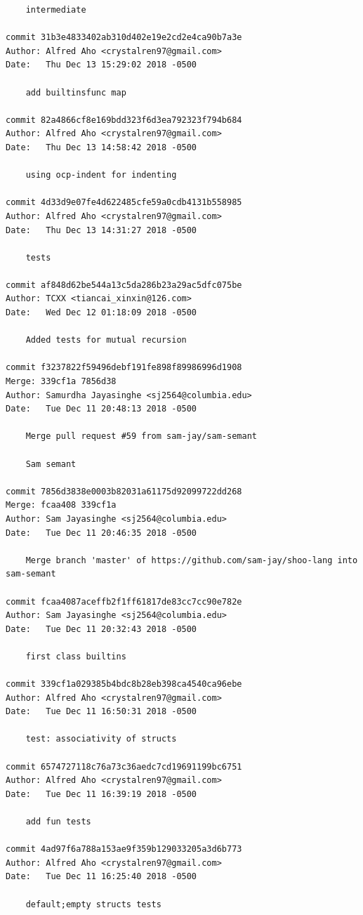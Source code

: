 \documentclass[12pt]{article}
\begin{document}
\begin{lstlisting}
    intermediate

commit 31b3e4833402ab310d402e19e2cd2e4ca90b7a3e
Author: Alfred Aho <crystalren97@gmail.com>
Date:   Thu Dec 13 15:29:02 2018 -0500

    add builtinsfunc map

commit 82a4866cf8e169bdd323f6d3ea792323f794b684
Author: Alfred Aho <crystalren97@gmail.com>
Date:   Thu Dec 13 14:58:42 2018 -0500

    using ocp-indent for indenting

commit 4d33d9e07fe4d622485cfe59a0cdb4131b558985
Author: Alfred Aho <crystalren97@gmail.com>
Date:   Thu Dec 13 14:31:27 2018 -0500

    tests

commit af848d62be544a13c5da286b23a29ac5dfc075be
Author: TCXX <tiancai_xinxin@126.com>
Date:   Wed Dec 12 01:18:09 2018 -0500

    Added tests for mutual recursion

commit f3237822f59496debf191fe898f89986996d1908
Merge: 339cf1a 7856d38
Author: Samurdha Jayasinghe <sj2564@columbia.edu>
Date:   Tue Dec 11 20:48:13 2018 -0500

    Merge pull request #59 from sam-jay/sam-semant
    
    Sam semant

commit 7856d3838e0003b82031a61175d92099722dd268
Merge: fcaa408 339cf1a
Author: Sam Jayasinghe <sj2564@columbia.edu>
Date:   Tue Dec 11 20:46:35 2018 -0500

    Merge branch 'master' of https://github.com/sam-jay/shoo-lang into sam-semant

commit fcaa4087aceffb2f1ff61817de83cc7cc90e782e
Author: Sam Jayasinghe <sj2564@columbia.edu>
Date:   Tue Dec 11 20:32:43 2018 -0500

    first class builtins

commit 339cf1a029385b4bdc8b28eb398ca4540ca96ebe
Author: Alfred Aho <crystalren97@gmail.com>
Date:   Tue Dec 11 16:50:31 2018 -0500

    test: associativity of structs

commit 6574727118c76a73c36aedc7cd19691199bc6751
Author: Alfred Aho <crystalren97@gmail.com>
Date:   Tue Dec 11 16:39:19 2018 -0500

    add fun tests

commit 4ad97f6a788a153ae9f359b129033205a3d6b773
Author: Alfred Aho <crystalren97@gmail.com>
Date:   Tue Dec 11 16:25:40 2018 -0500

    default;empty structs tests


\end{lstlisting}
\end{document}
